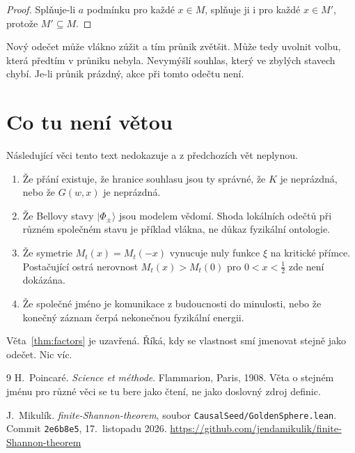 \documentclass[11pt,a4paper]{article}
\theoremstyle{definition}
\theoremstyle{remark}
\begin{document}
\begin{proof}
Splňuje-li \(a\) podmínku pro každé \(x\in M\), splňuje ji i pro každé \(x\in M'\),
protože \(M'\subseteq M\).
\end{proof}

Nový odečet může vlákno zúžit a tím průnik zvětšit.
Může tedy uvolnit volbu, která předtím v průniku nebyla.
Nevymýšlí souhlas, který ve zbylých stavech chybí.
Je-li průnik prázdný, akce při tomto odečtu není.

\section{Co tu není větou}

Následující věci tento text nedokazuje a z předchozích vět neplynou.

\begin{enumerate}
\item Že přání existuje, že hranice souhlasu jsou ty správné,
      že \(K\) je neprázdná, nebo že \(G(w,x)\) je neprázdná.
\item Že Bellovy stavy \(\lvert\Phi_\pm\rangle\) jsou modelem vědomí.
      Shoda lokálních odečtů při různém společném stavu je příklad vlákna,
      ne důkaz fyzikální ontologie.
\item Že symetrie \(M_t(x)=M_t(-x)\) vynucuje nuly funkce \(\xi\) na kritické přímce.
      Postačující ostrá nerovnost \(M_t(x)>M_t(0)\) pro \(0<x<\tfrac12\)
      zde není dokázána.
\item Že společné jméno je komunikace z budoucnosti do minulosti,
      nebo že konečný záznam čerpá nekonečnou fyzikální energii.
\end{enumerate}

Věta~\ref{thm:factors} je uzavřená.
Říká, kdy se vlastnost smí jmenovat stejně jako odečet.
Nic víc.

\begin{thebibliography}{9}
H.~Poincaré.
\newblock \emph{Science et méthode}.
\newblock Flammarion, Paris, 1908.
\newblock Věta o stejném jménu pro různé věci se tu bere jako čtení,
          ne jako doslovný zdroj definic.

J.~Mikulík.
\newblock \emph{finite-Shannon-theorem}, soubor \texttt{CausalSeed/GoldenSphere.lean}.
\newblock Commit \texttt{2e6b8e5}, 17.~listopadu 2026.
\newblock \url{https://github.com/jendamikulik/finite-Shannon-theorem}
\end{thebibliography}
\end{document}
